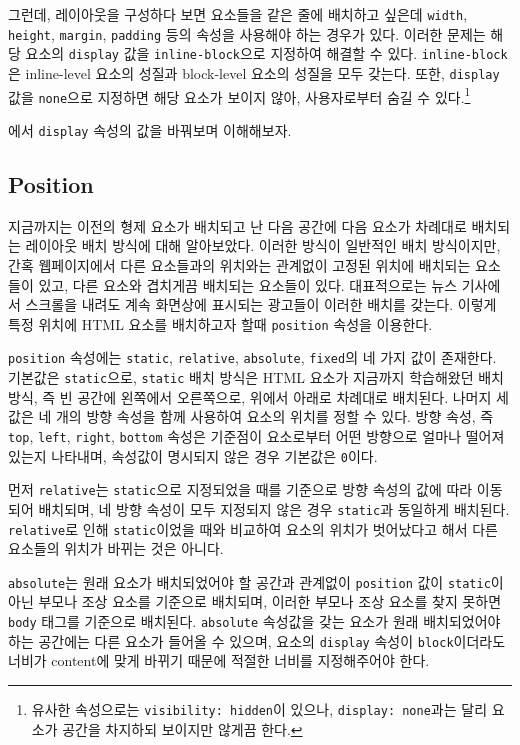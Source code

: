 그런데, 레이아웃을 구성하다 보면 요소들을 같은 줄에 배치하고 싶은데 \texttt{width}, \texttt{height}, \texttt{margin}, \texttt{padding} 등의 속성을 사용해야 하는 경우가 있다. 이러한 문제는 해당 요소의 \texttt{display} 값을 \texttt{inline-block}으로 지정하여 해결할 수 있다. \texttt{inline-block}은 inline-level 요소의 성질과 block-level 요소의 성질을 모두 갖는다. 또한, \texttt{display} 값을 \texttt{none}으로 지정하면 해당 요소가 보이지 않아, 사용자로부터 숨길 수 있다.\footnote{유사한 속성으로는 \texttt{visibility: hidden}이 있으나, \texttt{display: none}과는 달리 요소가 공간을 차지하되 보이지만 않게끔 한다.}
 
에서 \texttt{display} 속성의 값을 바꿔보며 이해해보자. 

\subsection*{Position}

지금까지는 이전의 형제 요소가 배치되고 난 다음 공간에 다음 요소가 차례대로 배치되는 레이아웃 배치 방식에 대해 알아보았다. 이러한 방식이 일반적인 배치 방식이지만, 간혹 웹페이지에서 다른 요소들과의 위치와는 관계없이 고정된 위치에 배치되는 요소들이 있고, 다른 요소와 겹치게끔 배치되는 요소들이 있다. 대표적으로는 뉴스 기사에서 스크롤을 내려도 계속 화면상에 표시되는 광고들이 이러한 배치를 갖는다. 이렇게 특정 위치에 HTML 요소를 배치하고자 할때 \texttt{position} 속성을 이용한다.

\texttt{position} 속성에는 \texttt{static}, \texttt{relative}, \texttt{absolute}, \texttt{fixed}의 네 가지 값이 존재한다. 기본값은 \texttt{static}으로, \texttt{static} 배치 방식은 HTML 요소가 지금까지 학습해왔던 배치 방식, 즉 빈 공간에 왼쪽에서 오른쪽으로, 위에서 아래로 차례대로 배치된다. 나머지 세 값은 네 개의 방향 속성을 함께 사용하여 요소의 위치를 정할 수 있다. 방향 속성, 즉 \texttt{top}, \texttt{left}, \texttt{right}, \texttt{bottom} 속성은 기준점이 요소로부터 어떤 방향으로 얼마나 떨어져 있는지 나타내며, 속성값이 명시되지 않은 경우 기본값은 \texttt{0}이다.

먼저 \texttt{relative}는 \texttt{static}으로 지정되었을 때를 기준으로 방향 속성의 값에 따라 이동되어 배치되며, 네 방향 속성이 모두 지정되지 않은 경우 \texttt{static}과 동일하게 배치된다. \texttt{relative}로 인해 \texttt{static}이었을 때와 비교하여 요소의 위치가 벗어났다고 해서 다른 요소들의 위치가 바뀌는 것은 아니다.

\texttt{absolute}는 원래 요소가 배치되었어야 할 공간과 관계없이 \texttt{position} 값이 \texttt{static}이 아닌 부모나 조상 요소를 기준으로 배치되며, 이러한 부모나 조상 요소를 찾지 못하면 \texttt{body} 태그를 기준으로 배치된다. \texttt{absolute} 속성값을 갖는 요소가 원래 배치되었어야 하는 공간에는 다른 요소가 들어올 수 있으며, 요소의 \texttt{display} 속성이 \texttt{block}이더라도 너비가 content에 맞게 바뀌기 때문에 적절한 너비를 지정해주어야 한다.


